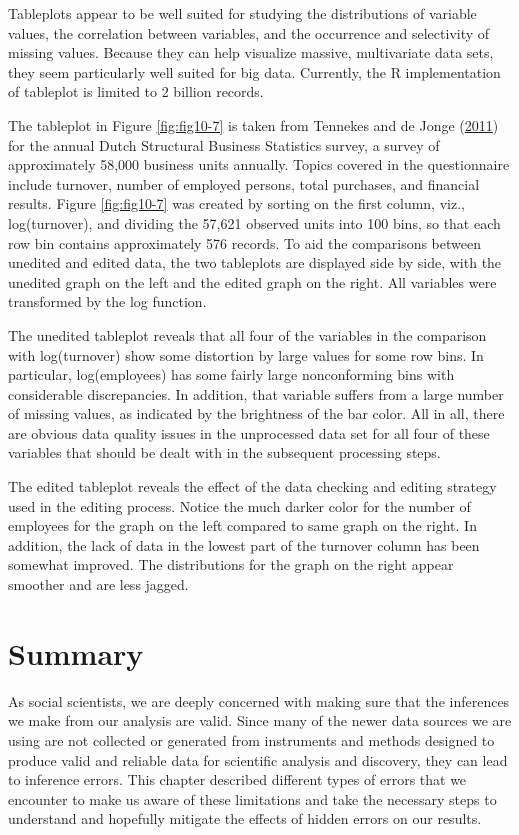 \documentclass[]{krantz}
\begin{document}
Tableplots appear to be well suited for studying the distributions of
variable values, the correlation between variables, and the occurrence
and selectivity of missing values. Because they can help visualize
massive, multivariate data sets, they seem particularly well suited for
big data. Currently, the R implementation of tableplot is limited to
\(2\) billion records.

The tableplot in Figure \ref{fig:fig10-7} is taken from Tennekes and de
Jonge (\protect\hyperlink{ref-tennekes2011top}{2011}) for the annual
Dutch Structural Business Statistics survey, a survey of approximately
58,000 business units annually. Topics covered in the questionnaire
include turnover, number of employed persons, total purchases, and
financial results. Figure \ref{fig:fig10-7} was created by sorting on
the first column, viz., log(turnover), and dividing the 57,621 observed
units into 100 bins, so that each row bin contains approximately 576
records. To aid the comparisons between unedited and edited data, the
two tableplots are displayed side by side, with the unedited graph on
the left and the edited graph on the right. All variables were
transformed by the log function.

The unedited tableplot reveals that all four of the variables in the
comparison with log(turnover) show some distortion by large values for
some row bins. In particular, log(employees) has some fairly large
nonconforming bins with considerable discrepancies. In addition, that
variable suffers from a large number of missing values, as indicated by
the brightness of the bar color. All in all, there are obvious data
quality issues in the unprocessed data set for all four of these
variables that should be dealt with in the subsequent processing steps.

The edited tableplot reveals the effect of the data checking and editing
strategy used in the editing process. Notice the much darker color for
the number of employees for the graph on the left compared to same graph
on the right. In addition, the lack of data in the lowest part of the
turnover column has been somewhat improved. The distributions for the
graph on the right appear smoother and are less jagged.

\section{Summary}\label{sec:10-6}

As social scientists, we are deeply concerned with making sure that the
inferences we make from our analysis are valid. Since many of the newer
data sources we are using are not collected or generated from
instruments and methods designed to produce valid and reliable data for
scientific analysis and discovery, they can lead to inference errors.
This chapter described different types of errors that we encounter to
make us aware of these limitations and take the necessary steps to
understand and hopefully mitigate the effects of hidden errors on our
results.
\end{document}
